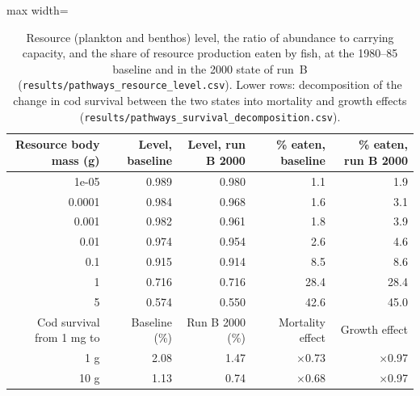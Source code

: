 \documentclass[11pt,letterpaper,fleqn]{article}
\begin{document}
\begin{table}[p]\caption{Resource (plankton and benthos) level, the ratio of abundance to carrying capacity, and the share of resource production eaten by fish, at the 1980--85 baseline and in the 2000 state of run~B (\nolinkurl{results/pathways_resource_level.csv}). Lower rows: decomposition of the change in cod survival between the two states into mortality and growth effects (\nolinkurl{results/pathways_survival_decomposition.csv}).}\label{tab:S-resource}
\centering\small\begin{adjustbox}{max width=\textwidth}\begin{tabular}{@{}rrrrr@{}}\toprule
Resource body mass (g) & Level, baseline & Level, run B 2000 & \% eaten, baseline & \% eaten, run B 2000\\\midrule
1e-05 & 0.989 & 0.980 & 1.1 & 1.9\\
0.0001 & 0.984 & 0.968 & 1.6 & 3.1\\
0.001 & 0.982 & 0.961 & 1.8 & 3.9\\
0.01 & 0.974 & 0.954 & 2.6 & 4.6\\
0.1 & 0.915 & 0.914 & 8.5 & 8.6\\
1 & 0.716 & 0.716 & 28.4 & 28.4\\
5 & 0.574 & 0.550 & 42.6 & 45.0\\
\midrule
Cod survival from 1 mg to & Baseline (\%) & Run B 2000 (\%) & Mortality effect & Growth effect\\\midrule
1 g & 2.08 & 1.47 & $\times$0.73 & $\times$0.97\\
10 g & 1.13 & 0.74 & $\times$0.68 & $\times$0.97\\
\bottomrule\end{tabular}\end{adjustbox}\end{table}
\end{document}
